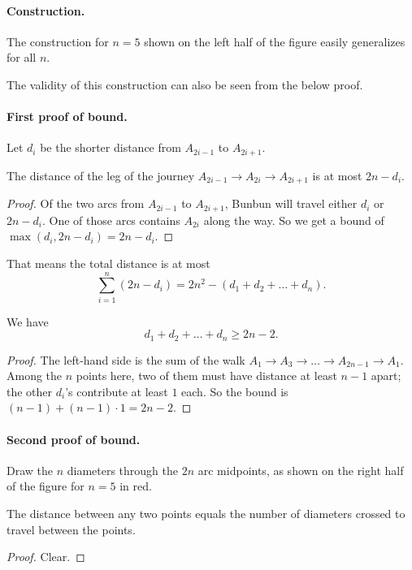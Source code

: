 \documentclass[11pt]{scrartcl}
\begin{document}
\paragraph{Construction.}
The construction for $n = 5$ shown on the left half of the figure
easily generalizes for all $n$.
\begin{remark*}
  The validity of this construction
  can also be seen from the below proof.
\end{remark*}

\paragraph{First proof of bound.}
Let $d_i$ be the shorter distance from $A_{2i-1}$ to $A_{2i+1}$.
\begin{claim*}
The distance of the leg of the journey $A_{2i-1} \to A_{2i} \to A_{2i+1}$
is at most $2n - d_i$.
\end{claim*}
\begin{proof}
  Of the two arcs from $A_{2i-1}$ to $A_{2i+1}$,
  Bunbun will travel either $d_i$ or $2n-d_i$.
  One of those arcs contains $A_{2i}$ along the way.
  So we get a bound of $\max(d_i, 2n-d_i) = 2n - d_i$.
\end{proof}
That means the total distance is at most
\[ \sum_{i=1}^n \left( 2n - d_i \right)
  = 2n^2 - (d_1 + d_2 + \dots + d_n). \]
\begin{claim*}
  We have \[ d_1 + d_2 + \dots + d_n \ge 2n-2. \]
\end{claim*}
\begin{proof}
  The left-hand side is the sum of the walk
  $A_1 \to A_3 \to \dots \to A_{2n-1} \to A_1$.
  Among the $n$ points here, two of them must have distance at least $n-1$ apart;
  the other $d_i$'s contribute at least $1$ each.
  So the bound is $(n-1) + (n-1) \cdot 1 = 2n-2$.
\end{proof}

\paragraph{Second proof of bound.}
Draw the $n$ diameters through the $2n$ arc midpoints,
as shown on the right half of the figure for $n = 5$ in red.
\begin{claim*}
  The distance between any two points equals the number of diameters crossed to travel between the points.
\end{claim*}
\begin{proof}
    Clear.
\end{proof}
\end{document}
